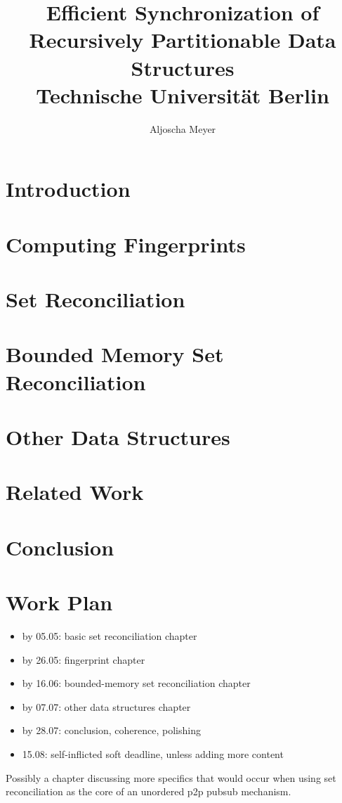 \documentclass[12pt,twoside]{report}
\title{
{Efficient Synchronization of Recursively Partitionable Data Structures}\\
{\large Technische Universität Berlin}
}
\author{Aljoscha Meyer}
\begin{document}
\maketitle



\tableofcontents

\chapter{Introduction}
\label{introduction}


\chapter{Computing Fingerprints}
\label{fingerprints}


\chapter{Set Reconciliation}
\label{basic-set-reconciliation}


\chapter{Bounded Memory Set Reconciliation}
\label{bounded-set-reconciliation}


\chapter{Other Data Structures}
\label{other-data-structures}


\chapter{Related Work}
\label{related-work}


\chapter{Conclusion}
\label{conclusion}


\chapter*{Work Plan}

\begin{itemize}
\item by 05.05: basic set reconciliation chapter
\item by 26.05: fingerprint chapter
\item by 16.06: bounded-memory set reconciliation chapter
\item by 07.07: other data structures chapter
\item by 28.07: conclusion, coherence, polishing
\item 15.08: self-inflicted soft deadline, unless adding more content
\end{itemize}

Possibly a chapter discussing more specifics that would occur when using set reconciliation as the core of an unordered p2p pubsub mechanism.



\end{document}
